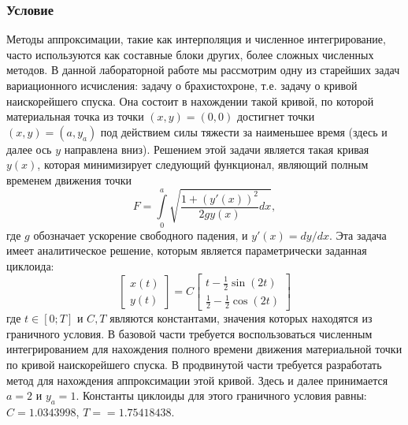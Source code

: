 \subsubsection*{Условие}
\label{section:условие}
Методы аппроксимации, такие как интерполяция и численное интегрирование, часто используются как составные блоки других, более сложных численных методов. В данной лабораторной работе мы рассмотрим одну из старейших задач вариационного исчисления: задачу о брахистохроне, т.е. задачу о кривой наискорейшего спуска. Она состоит в нахождении такой кривой, по которой материальная точка из точки $(x,y) = (0, 0)$ достигнет точки $(x,y) = (a, y_a)$ под действием силы тяжести за наименьшее время (здесь и далее ось $y$ направлена вниз). Решением этой задачи является такая кривая $y(x)$, которая минимизирует следующий функционал, являющий полным временем движения точки
\begin{equation}
    F = \int\limits_0^a\sqrt{\frac{1+(y'(x))^2}{2gy(x)}dx}, 
\end{equation}
где $g$ обозначает ускорение свободного падения, и $y'(x) = dy/dx$. Эта задача имеет аналитическое решение, которым является параметрически заданная циклоида:
\hypertarget{x}{}
\begin{equation}
    \begin{bmatrix}
    x(t) \\
    y(t)
    \end{bmatrix} = C \begin{bmatrix}
    t - \frac12\sin(2t) \\
    \frac12 - \frac12\cos(2t)
    \end{bmatrix}
\end{equation}
где $t \in [0; T]$ и $C, T$ являются константами, значения которых находятся из граничного условия. В базовой части требуется воспользоваться численным интегрированием для нахождения полного времени движения материальной точки по кривой наискорейшего спуска. В продвинутой части требуется разработать метод для нахождения аппроксимации этой кривой. Здесь и далее принимается $a = 2$ и $y_a = 1$. Константы циклоиды для этого граничного условия равны: $C = 1.0343998$,  $T = = 1.75418438$.
